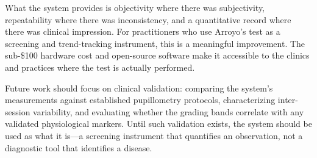 \documentclass[11pt]{article}
\begin{document}
What the system provides is objectivity where there was subjectivity,
repeatability where there was inconsistency, and a quantitative record where
there was clinical impression. For practitioners who use Arroyo's test as a
screening and trend-tracking instrument, this is a meaningful improvement.
The sub-\$100 hardware cost and open-source software make it accessible to
the clinics and practices where the test is actually performed.

Future work should focus on clinical validation: comparing the system's
measurements against established pupillometry protocols, characterizing
inter-session variability, and evaluating whether the grading bands
correlate with any validated physiological markers. Until such validation
exists, the system should be used as what it is---a screening instrument that
quantifies an observation, not a diagnostic tool that identifies a disease.
\end{document}
